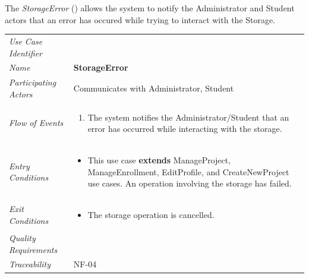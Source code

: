 \documentclass[12pt,letterpaper]{article}
\begin{document}
\vspace{1em}
The {\it StorageError} ({\bf \storageerror{}}) allows the system to notify the Administrator and Student actors that an error has occured while trying to interact with the Storage.

\begin{center}
	\begin{tabu} to 
		\toprule
		Use Case Identifier & \storageerror{} \\
		Name & {\bf StorageError} \\
		Participating Actors & Communicates with Administrator, Student \\
		Flow of Events & 
		\begin{minipage}[t]{\linewidth}
		    \begin{enumerate}
			    \item The system notifies the Administrator/Student that an error has occurred while interacting with the storage.
			\end{enumerate}
		\end{minipage} \\

		Entry Conditions &
		\begin{minipage}[t]{\linewidth}
			\begin{itemize}
			    \item This use case \textbf{extends} ManageProject, ManageEnrollment, EditProfile, and CreateNewProject use cases. An operation involving the storage has failed.
	        \end{itemize}
		\end{minipage} \\

		Exit Conditions &
		\begin{minipage}[t]{\linewidth}
			\begin{itemize}
			    \item The storage operation is cancelled.
	        \end{itemize}
		\end{minipage} \\

		Quality Requirements & \\

		Traceability & NF-04 \\
		\toprule
	\end{tabu}
\end{center}

\newpage{}
\end{document}
